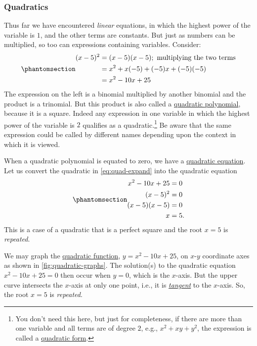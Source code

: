 \documentclass[
  a4paper,
]{article}
\begin{document}
\subsubsection{Quadratics}\label{quadratics}

Thus far we have encountered \emph{linear} equations, in which the
highest power of the variable is \(1\), and the other terms are
constants. But just as numbers can be multiplied, so too can expressions
containing variables. Consider:
\begin{equation}\phantomsection\label{eq:quad-expand}{
\begin{aligned}
(x - 5)^{2} &= (x - 5)(x - 5); \text{ multiplying the two terms}\\
&= x^2 +x(-5) + (-5)x + (-5)(-5)\\
&= x^2 - 10x + 25
\end{aligned}
}\end{equation} The expression on the left is a binomial multiplied by
another binomial and the product is a trinomial. But this product is
also called a \href{https://en.wikipedia.org/wiki/Quadratic}{quadratic
polynomial}, because it is a square. Indeed any expression in one
variable in which the highest power of the variable is \(2\) qualifies
as a quadratic.\footnote{You don't need this here, but just for
  completeness, if there are more than one variable and all terms are of
  degree \(2\), e.g., \(x^2 + xy + y^2\), the expression is called a
  \href{https://en.wikipedia.org/wiki/Quadratic_form}{quadratic form}.}
Be aware that the same expression could be called by different names
depending upon the context in which it is viewed.

When a quadratic polynomial is equated to zero, we have a
\href{https://en.wikipedia.org/wiki/Quadratic_equation}{quadratic
equation}. Let us convert the quadratic in \cref{eq:quad-expand} into
the quadratic equation
\begin{equation}\phantomsection\label{eq:repeated-root}{
\begin{aligned}
x^2 -10x + 25 &= 0\\
(x - 5)^2 &= 0\\
(x - 5)(x - 5) &= 0\\
x &= 5.
\end{aligned}
}\end{equation} This is a case of a quadratic that is a perfect square
and the root \(x = 5\) is \emph{repeated}.

We may graph the
\href{https://en.wikipedia.org/wiki/Quadratic_function}{quadratic
function}, \(y = x^2 -10x + 25\), on \(x\)-\(y\) coordinate axes as
shown in \cref{fig:quadratic-graphs}. The solution(s) to the quadratic
equation \(x^2 -10x + 25 = 0\) then occur when \(y = 0\), which is the
\(x\)-axis. But the upper curve intersects the \(x\)-axis at only one
point, i.e., it is
\href{https://en.wikipedia.org/wiki/Tangent}{\emph{tangent}} to the
\(x\)-axis. So, the root \(x = 5\) is \emph{repeated}.
\end{document}
